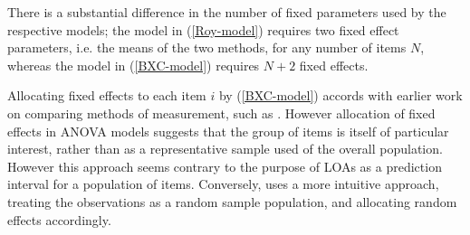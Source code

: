 \documentclass[12pt, a4paper]{report}
\theoremstyle{plain}
\theoremstyle{definition}
\theoremstyle{remark}
\begin{document}
There is a substantial difference in the number of fixed parameters used by the respective models; the model in (\ref{Roy-model}) requires two fixed effect parameters, i.e. the means of the two methods, for any number of items $N$, whereas the model in (\ref{BXC-model}) requires $N+2$ fixed effects.

Allocating fixed effects to each item $i$ by (\ref{BXC-model}) accords with earlier work on comparing methods of measurement, such as \citet{Grubbs48}. However allocation of fixed effects in ANOVA models suggests that the group of items is itself of particular interest, rather than as a representative sample used of the overall population. However this approach seems contrary to the purpose of LOAs as a prediction interval for a population of items. Conversely, \citet{roy}
uses a more intuitive approach, treating the observations as a random sample population, and allocating random effects accordingly.


\end{document}

